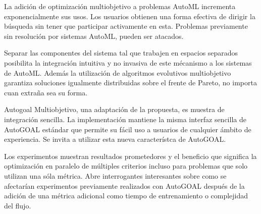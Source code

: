 \begin{conclusions}
    La adici\'on de optimizaci\'on multiobjetivo a problemas AutoML incrementa exponencialmente sus usos. Los usuarios obtienen una forma efectiva de dirigir la b\'usqueda sin tener que participar activamente en esta. Problemas previamente sin resoluci\'on por sistemas AutoML, pueden ser atacados.

    Separar las componentes del sistema tal que trabajen en espacios separados posibilita la integraci\'on intuitiva y no invasiva de este m\'ecanismo a los sistemas de AutoML. Adem\'as la utilizaci\'on de algoritmos evolutivos multiobjetivo garantiza soluciones igualmente distribuidas sobre el frente de Pareto, no importa cuan extra\~na sea su forma.

    Autogoal Multiobjetivo, una adaptaci\'on de la propuesta, es muestra de integraci\'on sencilla. La implementaci\'on mantiene  la misma interfaz sencilla de AutoGOAL est\'andar que permite su f\'acil uso a usuarios de cualquier \'ambito de experiencia. Se invita a utilizar esta nueva caracter\'istca de AutoGOAL.

    Los experimentos muestran resultados prometedores y el beneficio que significa la optimizaci\'on en paralelo de m\'ultiples criterios incluso para problemas que solo utilizan una s\'ola m\'etrica.
    Abre interrogantes interesantes sobre como se afectar\'ian experimentos previamente realizados con AutoGOAL despu\'es de la adici\'on de una m\'etrica adicional como tiempo de entrenamiento o complejidad del flujo.





\end{conclusions}
